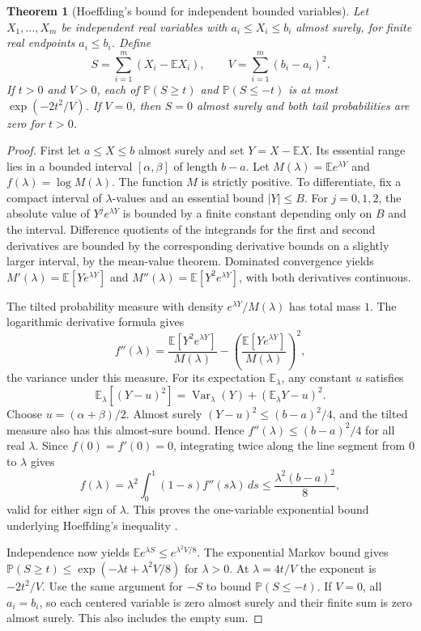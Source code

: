 \documentclass[11pt,oneside,openany]{book}
\theoremstyle{plain}
\newtheorem{theorem}{Theorem}[chapter]
\theoremstyle{definition}
\theoremstyle{remark}
\begin{document}
\begin{theorem}[Hoeffding's bound for independent bounded variables]
\label{p205:W25}
Let \(X_1,\ldots,X_m\) be independent real variables with
\(a_i\le X_i\le b_i\) almost surely, for finite real endpoints
\(a_i\le b_i\). Define
\[
  S=\sum_{i=1}^m(X_i-\mathbb E X_i),\qquad
  V=\sum_{i=1}^m(b_i-a_i)^2.
\]
If \(t>0\) and \(V>0\), each of
\(\mathbb P(S\ge t)\) and \(\mathbb P(S\le -t)\) is at most
\(\exp(-2t^2/V)\). If \(V=0\), then \(S=0\) almost surely and
both tail probabilities are zero for \(t>0\).
\end{theorem}

\begin{proof}
First let \(a\le X\le b\) almost surely and set
\(Y=X-\mathbb E X\). Its essential range lies in a bounded
interval \([\alpha,\beta]\) of length \(b-a\).
Let \(M(\lambda)=\mathbb E e^{\lambda Y}\) and
\(f(\lambda)=\log M(\lambda)\). The function \(M\) is strictly
positive. To differentiate, fix a compact interval of
\(\lambda\)-values and an essential bound \(|Y|\le B\).
For \(j=0,1,2\), the absolute value of
\(Y^j e^{\lambda Y}\) is bounded by a finite constant
depending only on \(B\) and the interval. Difference quotients
of the integrands for the first and second derivatives are
bounded by the corresponding derivative bounds on a slightly
larger interval, by the mean-value theorem. Dominated convergence
\cite[Theorem~D11.06.dominated\_convergence]{d11}
yields \(M'(\lambda)=\mathbb E[Ye^{\lambda Y}]\) and
\(M''(\lambda)=\mathbb E[Y^2e^{\lambda Y}]\), with both
derivatives continuous.

The tilted probability measure with density
\(e^{\lambda Y}/M(\lambda)\) has total mass \(1\). The
logarithmic derivative formula gives
\[
 f''(\lambda)=
     \frac{\mathbb E[Y^2e^{\lambda Y}]}{M(\lambda)}
     -\left(\frac{\mathbb E[Ye^{\lambda Y}]}{M(\lambda)}\right)^2,
\]
the variance under this measure. For its expectation
\(\mathbb E_\lambda\), any constant \(u\) satisfies
\[
 \mathbb E_\lambda[(Y-u)^2]
  =\operatorname{Var}_\lambda(Y)+(\mathbb E_\lambda Y-u)^2 .
\]
Choose \(u=(\alpha+\beta)/2\). Almost surely
\((Y-u)^2\le (b-a)^2/4\), and the tilted measure also has this
almost-sure bound. Hence \(f''(\lambda)\le (b-a)^2/4\) for all
real \(\lambda\). Since \(f(0)=f'(0)=0\), integrating twice
along the line segment from \(0\) to \(\lambda\) gives
\[
 f(\lambda)=\lambda^2\int_0^1 (1-s) f''(s\lambda)\,ds
     \le\frac{\lambda^2(b-a)^2}{8},
\]
valid for either sign of \(\lambda\). This proves the
one-variable exponential bound underlying Hoeffding's
inequality \cite{hoeffding,alon}.

Independence now yields
\(\mathbb E e^{\lambda S}\le e^{\lambda^2 V/8}\). The
exponential Markov bound gives
\(\mathbb P(S\ge t)\le\exp(-\lambda t+\lambda^2V/8)\)
for \(\lambda>0\). At \(\lambda=4t/V\) the exponent is
\(-2t^2/V\). Use the same argument for \(-S\) to bound
\(\mathbb P(S\le-t)\). If \(V=0\), all \(a_i=b_i\), so
each centered variable is zero almost surely and their finite
sum is zero almost surely. This also includes the empty sum.
\end{proof}
\end{document}
